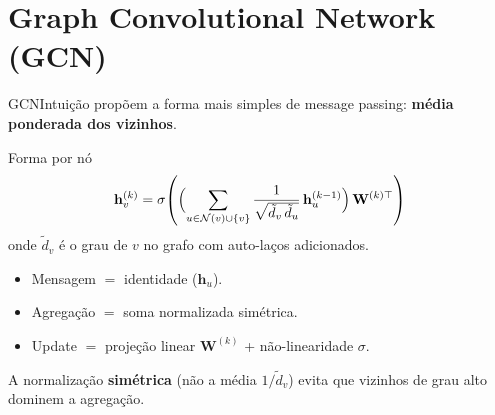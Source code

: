 \documentclass[aspectratio=169,xcolor=dvipsnames]{beamer}
\begin{document}
  \section{Graph Convolutional Network (GCN)}

  \begin{frame}{GCN}{Intuição}
     propõem a forma mais simples de message
    passing: \textbf{média ponderada dos vizinhos}.

    \vspace{0.25em}
    \begin{block}{Forma por nó}
      \[
        \mathbf{h}^{(k)}_v = \sigma\!\left(
          \Bigl(\sum_{u \in \mathcal{N}(v) \cup \{v\}}
            \frac{1}{\sqrt{\tilde d_v\, \tilde d_u}}\, \mathbf{h}^{(k-1)}_u\Bigr)\, \mathbf{W}^{(k)\top}
        \right)
      \]
      onde $\tilde d_v$ é o grau de $v$ no grafo com auto-laços adicionados.
    \end{block}

    \vspace{0.2em}
    \begin{itemize}
      \item Mensagem $=$ identidade ($\mathbf{h}_u$).
      \item Agregação $=$ soma normalizada simétrica.
      \item Update $=$ projeção linear $\mathbf{W}^{(k)}$ + não-linearidade $\sigma$.
    \end{itemize}
    {\footnotesize A normalização \textbf{simétrica} (não a média $1/\tilde d_v$) evita que vizinhos de grau alto dominem a agregação.}
  \end{frame}
\end{document}
